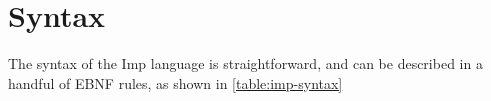 \section{Syntax}
The syntax of the Imp language is straightforward, and can be described in a
handful of EBNF rules, as shown in \cref{table:imp-syntax}

%
